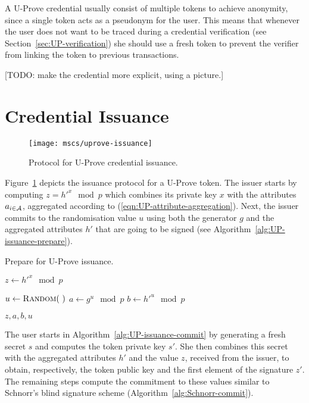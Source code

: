 A U-Prove credential usually consist of multiple tokens to achieve anonymity,
since a single token acts as a pseudonym for the user. This means that whenever
the user does not want to be traced during a credential verification (see
Section~\ref{sec:UP-verification}) she should use a fresh token to prevent the
verifier from linking the token to previous transactions.

[TODO: make the credential more explicit, using a picture.]

\section{Credential Issuance}\label{sec:UP-issuance}

\begin{figure}[ht]
  \centering
  \texttt{[image: mscs/uprove-issuance]}
  \caption{Protocol for U-Prove credential issuance.}
  \label{msc:uprove-issuance}
\end{figure}

Figure~\ref{msc:uprove-issuance} depicts the issuance protocol for a U-Prove
token. The issuer starts by computing $z = h'^x \mod p$ which combines its
private key $x$ with the attributes $a_{i \in \mathcal{A}}$, aggregated according to
(\ref{eqn:UP-attribute-aggregation}). Next, the issuer commits to the
randomisation value $u$ using both the generator $g$ and the aggregated
attributes $h'$ that are going to be signed (see
Algorithm~\ref{alg:UP-issuance-prepare}).

\begin{algorithm}
  \caption{Prepare for U-Prove issuance.}
  \label{alg:UP-issuance-prepare}
  \addtolength{\baselineskip}{1mm}
  \begin{algorithmic}[1]
      \State $z \gets h'^x \mod p$

      \State $u \gets \Call{Random}{~}$
      \State $a \gets g^u \mod p$
      \State $b \gets h'^u \mod p$

      \Return $z, a, b, u$
    \EndFunction
  \end{algorithmic}
\end{algorithm}

The user starts in Algorithm~\ref{alg:UP-issuance-commit} by generating a fresh
secret $s$ and computes the token private key $s'$. She then combines this
secret with the aggregated attributes $h'$ and the value $z$, received from the
issuer, to obtain, respectively, the token public key and the first element of
the signature $z'$. The remaining steps compute the commitment to these values
similar to Schnorr's blind signature scheme (Algorithm~\ref{alg:Schnorr-commit}).

